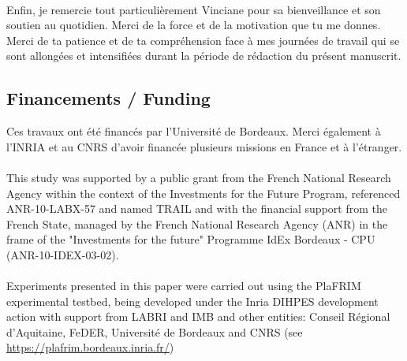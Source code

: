 \paragraph{}
Enfin, je remercie tout particulièrement Vinciane pour sa bienveillance et son soutien au quotidien. 
Merci de la force et de la motivation que tu me donnes. 
Merci de ta patience et de ta compréhension face à mes journées de travail qui se sont allongées et intensifiées durant la période de rédaction du présent manuscrit. 

\subsection*{Financements / Funding}
Ces travaux ont été financés par l'Université de Bordeaux. 
Merci également à l'INRIA et au CNRS d'avoir financée plusieurs missions en France et à l'étranger.


\paragraph{}
This study was supported by a public grant from the French National Research
Agency within the context of the Investments for the Future Program, referenced ANR-10-LABX-57 and named TRAIL
and with the financial support from the French State, managed by the French National Research Agency (ANR) in the frame of the "Investments for the future" Programme IdEx Bordeaux - CPU (ANR-10-IDEX-03-02).


\paragraph{}
Experiments presented in this paper were carried out using the PlaFRIM experimental testbed,
being developed under the Inria DIHPES development action with support from LABRI and
IMB and other entities: Conseil Régional d’Aquitaine, FeDER, Université de Bordeaux and
CNRS (see \url{https://plafrim.bordeaux.inria.fr/})
